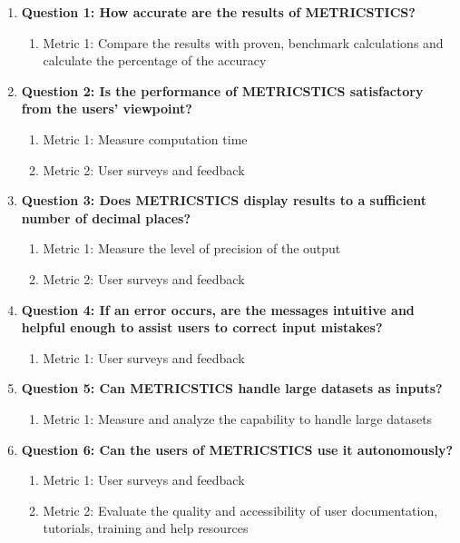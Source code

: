 \begin{enumerate}
    \item \textbf{Question 1: How accurate are the results of METRICSTICS?}
    \begin{enumerate}
        \item{Metric 1: Compare the results with proven, benchmark calculations and calculate the percentage of the accuracy}
    \end{enumerate}
    
    \item \textbf{Question 2: Is the performance of METRICSTICS satisfactory from the users' viewpoint?}
    \begin{enumerate}
        \item{Metric 1: Measure computation time}
        \item{Metric 2: User surveys and feedback}
    \end{enumerate}
    
    \item \textbf{Question 3: Does METRICSTICS display results to a sufficient number of decimal places?}
    \begin{enumerate}
        \item{Metric 1: Measure the level of precision of the output}
        \item{Metric 2: User surveys and feedback}
    \end{enumerate}
    
    \item \textbf{Question 4: If an error occurs, are the messages intuitive and helpful enough to assist users to correct input mistakes?}
    \begin{enumerate}
        \item{Metric 1: User surveys and feedback}
    \end{enumerate}
    
    \item \textbf{Question 5: Can METRICSTICS handle large datasets as inputs?}
    \begin{enumerate}
        \item{Metric 1: Measure and analyze the capability to handle large datasets}
    \end{enumerate}
    
    \item \textbf{Question 6: Can the users of METRICSTICS use it autonomously?}
    \begin{enumerate}
        \item{Metric 1: User surveys and feedback}
        \item{Metric 2: Evaluate the quality and accessibility of user documentation, tutorials, training and help resources}
    \end{enumerate}
    

\end{enumerate}
